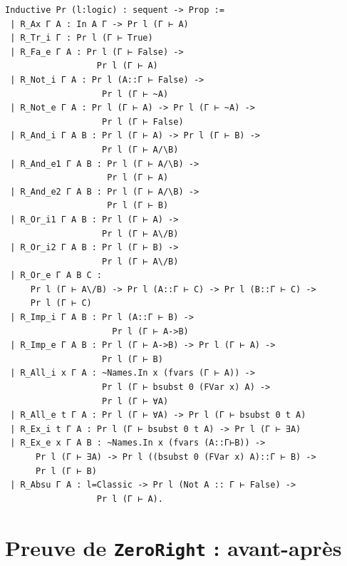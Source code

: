\documentclass[a4paper]{article}
\theoremstyle{remark}
\theoremstyle{remark}
\theoremstyle{remark}
\theoremstyle{definition}
\theoremstyle{definition}
\theoremstyle{definition}
\begin{document}
\begin{verbatim}
Inductive Pr (l:logic) : sequent -> Prop :=
 | R_Ax Γ A : In A Γ -> Pr l (Γ ⊢ A)
 | R_Tr_i Γ : Pr l (Γ ⊢ True)
 | R_Fa_e Γ A : Pr l (Γ ⊢ False) ->
                  Pr l (Γ ⊢ A)
 | R_Not_i Γ A : Pr l (A::Γ ⊢ False) ->
                   Pr l (Γ ⊢ ~A)
 | R_Not_e Γ A : Pr l (Γ ⊢ A) -> Pr l (Γ ⊢ ~A) ->
                   Pr l (Γ ⊢ False)
 | R_And_i Γ A B : Pr l (Γ ⊢ A) -> Pr l (Γ ⊢ B) ->
                   Pr l (Γ ⊢ A/\B)
 | R_And_e1 Γ A B : Pr l (Γ ⊢ A/\B) ->
                    Pr l (Γ ⊢ A)
 | R_And_e2 Γ A B : Pr l (Γ ⊢ A/\B) ->
                    Pr l (Γ ⊢ B)
 | R_Or_i1 Γ A B : Pr l (Γ ⊢ A) ->
                   Pr l (Γ ⊢ A\/B)
 | R_Or_i2 Γ A B : Pr l (Γ ⊢ B) ->
                   Pr l (Γ ⊢ A\/B)
 | R_Or_e Γ A B C :
     Pr l (Γ ⊢ A\/B) -> Pr l (A::Γ ⊢ C) -> Pr l (B::Γ ⊢ C) ->
     Pr l (Γ ⊢ C)
 | R_Imp_i Γ A B : Pr l (A::Γ ⊢ B) ->
                     Pr l (Γ ⊢ A->B)
 | R_Imp_e Γ A B : Pr l (Γ ⊢ A->B) -> Pr l (Γ ⊢ A) ->
                   Pr l (Γ ⊢ B)
 | R_All_i x Γ A : ~Names.In x (fvars (Γ ⊢ A)) ->
                   Pr l (Γ ⊢ bsubst 0 (FVar x) A) ->
                   Pr l (Γ ⊢ ∀A)
 | R_All_e t Γ A : Pr l (Γ ⊢ ∀A) -> Pr l (Γ ⊢ bsubst 0 t A)
 | R_Ex_i t Γ A : Pr l (Γ ⊢ bsubst 0 t A) -> Pr l (Γ ⊢ ∃A)
 | R_Ex_e x Γ A B : ~Names.In x (fvars (A::Γ⊢B)) ->
      Pr l (Γ ⊢ ∃A) -> Pr l ((bsubst 0 (FVar x) A)::Γ ⊢ B) ->
      Pr l (Γ ⊢ B)
 | R_Absu Γ A : l=Classic -> Pr l (Not A :: Γ ⊢ False) ->
                  Pr l (Γ ⊢ A).
\end{verbatim}



\section{Preuve de \texttt{ZeroRight} : avant-après}\label{beforeafter_zeroright}
\end{document}
